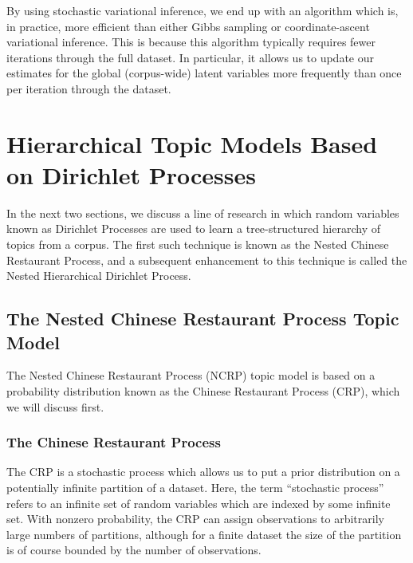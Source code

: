 \documentclass{article}
\begin{document}

By using stochastic variational inference, we end up with an algorithm which is, in practice, more efficient than either Gibbs sampling or coordinate-ascent variational inference.
This is because this algorithm typically requires fewer iterations through the full dataset.
In particular, it allows us to update our estimates for the global (corpus-wide) latent variables more frequently than once per iteration through the dataset.


\section{Hierarchical Topic Models Based on Dirichlet Processes}

In the next two sections, we discuss a line of research in which random variables known as Dirichlet Processes are used to learn a tree-structured hierarchy of topics from a corpus.
The first such technique is known as the Nested Chinese Restaurant Process, and a subsequent enhancement to this technique is called the Nested Hierarchical Dirichlet Process.

\subsection{The Nested Chinese Restaurant Process Topic Model}

The Nested Chinese Restaurant Process (NCRP) topic model is based on a probability distribution known as the Chinese Restaurant Process (CRP), which we will discuss first.

\subsubsection{The Chinese Restaurant Process}

The CRP is a stochastic process which allows us to put a prior distribution on a potentially infinite partition of a dataset.
Here, the term ``stochastic process'' refers to an infinite set of random variables which are indexed by some infinite set.
With nonzero probability, the CRP can assign observations to arbitrarily large numbers of partitions, although for a finite dataset the size of the partition is of course bounded by the number of observations.
\end{document}

